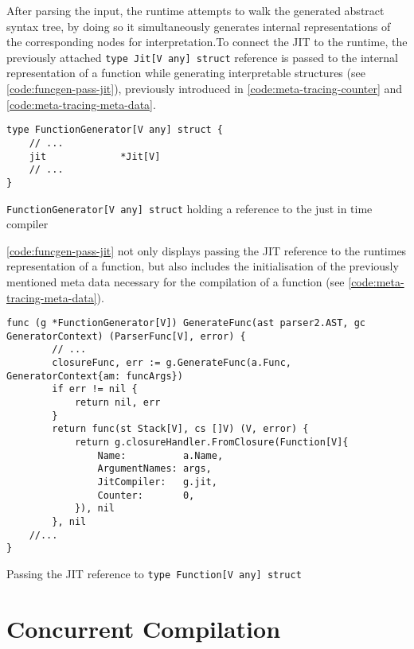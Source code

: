 After parsing the input, the runtime attempts to walk the
generated abstract syntax tree, by doing so it simultaneously generates
internal representations of the corresponding nodes for interpretation.To
connect the JIT to the runtime, the previously attached \texttt{type Jit[V any] struct} reference is passed to the internal representation of a
function while generating interpretable structures (see \autoref{code:funcgen-pass-jit}), previously introduced in
\autoref{code:meta-tracing-counter} and
\autoref{code:meta-tracing-meta-data}.

\begin{listing}[H]
    \begin{verbatim}
type FunctionGenerator[V any] struct {
    // ...
    jit             *Jit[V]
    // ...
}
    \end{verbatim}
    \caption{\texttt{FunctionGenerator[V any] struct} holding a reference to the just in time compiler}
    \label{code:funcgen-ref-jit}
\end{listing}

\autoref{code:funcgen-pass-jit} not only displays passing the JIT reference
to the runtimes representation of a function, but also includes the
initialisation of the previously mentioned meta data necessary for the
compilation of a function (see \autoref{code:meta-tracing-meta-data}).

\begin{listing}[H]
    \begin{verbatim}
func (g *FunctionGenerator[V]) GenerateFunc(ast parser2.AST, gc GeneratorContext) (ParserFunc[V], error) {
        // ...
        closureFunc, err := g.GenerateFunc(a.Func, GeneratorContext{am: funcArgs})
        if err != nil {
            return nil, err
        }
        return func(st Stack[V], cs []V) (V, error) {
            return g.closureHandler.FromClosure(Function[V]{
                Name:          a.Name,
                ArgumentNames: args,
                JitCompiler:   g.jit,
                Counter:       0,
            }), nil
        }, nil
    //...
}
    \end{verbatim}
    \caption{Passing the JIT reference to \texttt{type Function[V any] struct}}
    \label{code:funcgen-pass-jit}
\end{listing}

\section{Concurrent Compilation}
\label{sec:concurrent-compilation}


